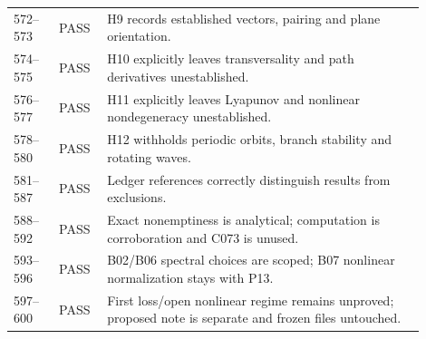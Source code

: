 \documentclass[11pt]{article}
\begin{document}
\begin{longtable}{p{0.10\linewidth}p{0.10\linewidth}p{0.70\linewidth}}
572--573&PASS&H9 records established vectors, pairing and plane orientation.\\
574--575&PASS&H10 explicitly leaves transversality and path derivatives unestablished.\\
576--577&PASS&H11 explicitly leaves Lyapunov and nonlinear nondegeneracy unestablished.\\
578--580&PASS&H12 withholds periodic orbits, branch stability and rotating waves.\\
581--587&PASS&Ledger references correctly distinguish results from exclusions.\\
588--592&PASS&Exact nonemptiness is analytical; computation is corroboration and C073 is unused.\\
593--596&PASS&B02/B06 spectral choices are scoped; B07 nonlinear normalization stays with P13.\\
597--600&PASS&First loss/open nonlinear regime remains unproved; proposed note is separate and frozen files untouched.\\
\bottomrule\end{longtable}
\end{document}
